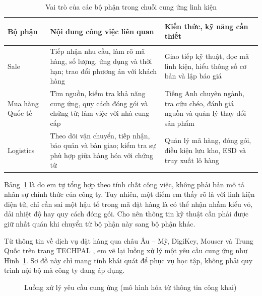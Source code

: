 \begin{table}[H]
\centering
\caption{Vai trò của các bộ phận trong chuỗi cung ứng linh kiện}
\label{tab:chapter2-roles}
\small
\renewcommand{\arraystretch}{1.1}
\begin{tabularx}{\textwidth}{>{\bfseries\raggedright\arraybackslash}p{3.1cm} >{\raggedright\arraybackslash}X >{\raggedright\arraybackslash}X}
\toprule
Bộ phận & Nội dung công việc liên quan & Kiến thức, kỹ năng cần thiết \\
\midrule
Sale & Tiếp nhận nhu cầu, làm rõ mã hàng, số lượng, ứng dụng và thời hạn; trao đổi phương án với khách hàng & Giao tiếp kỹ thuật, đọc mã linh kiện, hiểu thông số cơ bản và lập báo giá \\
Mua hàng Quốc tế & Tìm nguồn, kiểm tra khả năng cung ứng, quy cách đóng gói và chứng từ; làm việc với nhà cung cấp & Tiếng Anh chuyên ngành, tra cứu chéo, đánh giá nguồn và quản lý thay đổi sản phẩm \\
Logistics & Theo dõi vận chuyển, tiếp nhận, bảo quản và bàn giao; kiểm tra sự phù hợp giữa hàng hóa với chứng từ & Quản lý mã hàng, đóng gói, điều kiện lưu kho, ESD và truy xuất lô hàng \\
\bottomrule
\end{tabularx}
\end{table}

Bảng~\ref{tab:chapter2-roles} là do em tự tổng hợp theo tính chất công việc, không
phải bản mô tả nhân sự chính thức của công ty. Tuy nhiên, một điểm em thấy rõ là
với linh kiện điện tử, chỉ cần sai một hậu tố trong mã đặt hàng là có thể nhận
nhầm kiểu vỏ, dải nhiệt độ hay quy cách đóng gói. Cho nên thông tin kỹ thuật
cần phải được giữ nhất quán khi chuyển từ bộ phận này sang bộ phận khác.

Từ thông tin về dịch vụ đặt hàng qua châu Âu -- Mỹ, DigiKey, Mouser và Trung
Quốc trên trang TECHPAL \cite{techpal-about}, em vẽ lại luồng xử lý một
yêu cầu cung ứng như Hình~\ref{fig:supply-flow}. Sơ đồ này chỉ mang tính khái
quát để phục vụ học tập, không phải quy trình nội bộ mà công ty đang áp dụng.

\begin{figure}[H]
\centering
{}
\caption{Luồng xử lý yêu cầu cung ứng (mô hình hóa từ thông tin công khai)}
\label{fig:supply-flow}
\end{figure}

